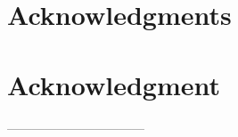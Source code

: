 \documentclass[conference,compsoc]{IEEEtran}
\begin{document}
  \section*{Acknowledgments}
\else
  \section*{Acknowledgment}
\fi

---------------------------------





\end{document}
